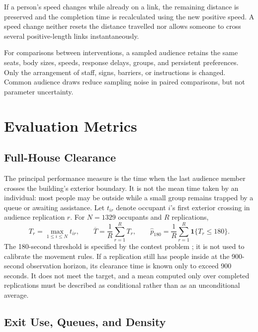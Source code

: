 \documentclass[11pt,a4paper]{article}
\newcommand{\ind}{\mathbf{1}}
\begin{document}
If a person's speed changes while already on a link, the remaining distance is preserved and the completion time is recalculated using the new positive speed. A speed change neither resets the distance travelled nor allows someone to cross several positive-length links instantaneously.

For comparisons between interventions, a sampled audience retains the same seats, body sizes, speeds, response delays, groups, and persistent preferences. Only the arrangement of staff, signs, barriers, or instructions is changed. Common audience draws reduce sampling noise in paired comparisons, but not parameter uncertainty.

\section{Evaluation Metrics}

\subsection{Full-House Clearance}

The principal performance measure is the time when the last audience member crosses the building's exterior boundary. It is not the mean time taken by an individual: most people may be outside while a small group remains trapped by a queue or awaiting assistance. Let $t_{ir}$ denote occupant $i$'s first exterior crossing in audience replication $r$. For $N=1329$ occupants and $R$ replications,
\begin{equation}\label{eq:clearance}
T_r=\max_{1\leq i\leq N}t_{ir},\qquad
\overline T=\frac{1}{R}\sum_{r=1}^{R}T_r,\qquad
\widehat p_{180}=\frac{1}{R}\sum_{r=1}^{R}\ind\{T_r\leq180\}.
\end{equation}
The 180-second threshold is specified by the contest problem \cite{brief}; it is not used to calibrate the movement rules. If a replication still has people inside at the 900-second observation horizon, its clearance time is known only to exceed 900 seconds. It does not meet the target, and a mean computed only over completed replications must be described as conditional rather than as an unconditional average.

\subsection{Exit Use, Queues, and Density}
\end{document}
